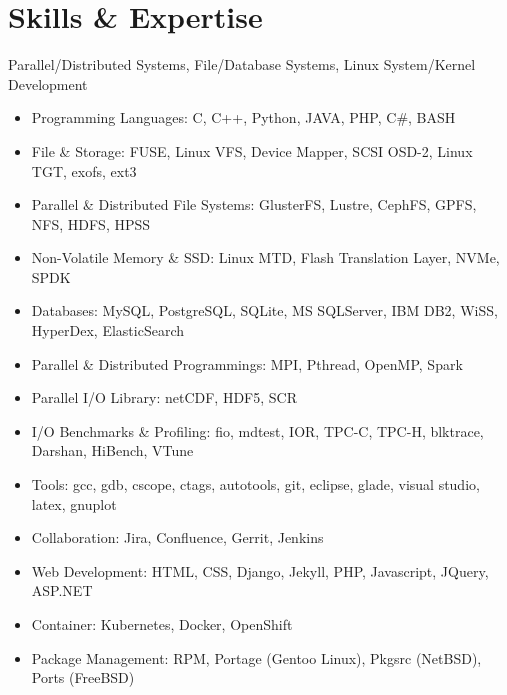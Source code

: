 \section{Skills \& Expertise}
Parallel/Distributed Systems, File/Database Systems, Linux System/Kernel Development
\begin{itemize}
\item {Programming Languages}: C, C++, Python, JAVA, PHP, C\#, BASH
\item {File \& Storage}: FUSE, Linux VFS, Device Mapper, SCSI OSD-2, Linux TGT, exofs, ext3
\item {Parallel \& Distributed File Systems}: GlusterFS, Lustre, CephFS, GPFS, NFS, HDFS, HPSS
\item {Non-Volatile Memory \& SSD}: Linux MTD, Flash Translation Layer, NVMe, SPDK
\item {Databases}: MySQL, PostgreSQL, SQLite, MS SQLServer, IBM DB2, WiSS, HyperDex, ElasticSearch
\item {Parallel \& Distributed Programmings}: MPI, Pthread, OpenMP, Spark
\item {Parallel I/O Library}: netCDF, HDF5, SCR
\item {I/O Benchmarks \& Profiling}: fio, mdtest, IOR, TPC-C, TPC-H, blktrace, Darshan, HiBench, VTune
\item {Tools}: gcc, gdb, cscope, ctags, autotools, git, eclipse, glade, visual studio, latex, gnuplot
\item {Collaboration}: Jira, Confluence, Gerrit, Jenkins
\item {Web Development}: HTML, CSS, Django, Jekyll, PHP, Javascript, JQuery, ASP.NET
\item {Container}: Kubernetes, Docker, OpenShift
\item {Package Management}: RPM, Portage (Gentoo Linux), Pkgsrc (NetBSD), Ports (FreeBSD)
\end{itemize}

